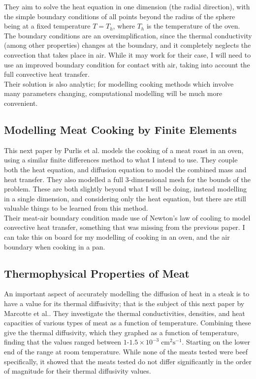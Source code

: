 \documentclass[11pt]{article}
\begin{document}
	They aim to solve the heat equation in one dimension (the radial direction), with the simple boundary conditions of all points beyond the radius of the sphere being at a fixed temperature $T=T_h$, where $T_h$ is the temperature of the oven. The boundary conditions are an oversimplification, since the thermal conductivity (among other properties) changes at the boundary, and it completely neglects the convection that takes place in air. While it may work for their case, I will need to use an improved boundary condition for contact with air, taking into account the full convective heat transfer. \\
	
	Their solution is also analytic; for modelling cooking methods which involve many parameters changing, computational modelling will be much more convenient.
	
	\subsection*{Modelling Meat Cooking by Finite Elements}
	
	This next paper by Purlis et al.\cite{meat_cook_finite_elements} models the cooking of a meat roast in an oven, using a similar finite differences method to what I intend to use. They couple both the heat equation, and diffusion equation to model the combined mass and heat transfer. They also modelled a full 3-dimensional mesh for the bounds of the problem. These are both slightly beyond what I will be doing, instead modelling in a single dimension, and considering only the heat equation, but there are still valuable things to be learned from this method. \\
	
	Their meat-air boundary condition made use of Newton's law of cooling to model convective heat transfer, something that was missing from the previous paper. I can take this on board for my modelling of cooking in an oven, and the air boundary when cooking in a pan.
	
	\subsection*{Thermophysical Properties of Meat}
	
	An important aspect of accurately modelling the diffusion of heat in a steak is to have a value for its thermal diffusivity; that is the subject of this next paper by Marcotte et al.\cite{meat_diffusivity}. They investigate the thermal conductivities, densities, and heat capacities of various types of meat as a function of temperature. Combining these give the thermal diffusivity, which they graphed as a function of temperature, finding that the values ranged between $1\text{-}1.5 \times 10^{-3}\;\mathrm{cm}^2\mathrm{s}^{-1}$. Starting on the lower end of the range at room temperature. While none of the meats tested were beef specifically, it showed that the meats tested do not differ significantly in the order of magnitude for their thermal diffusivity values. \\
	
\end{document}

